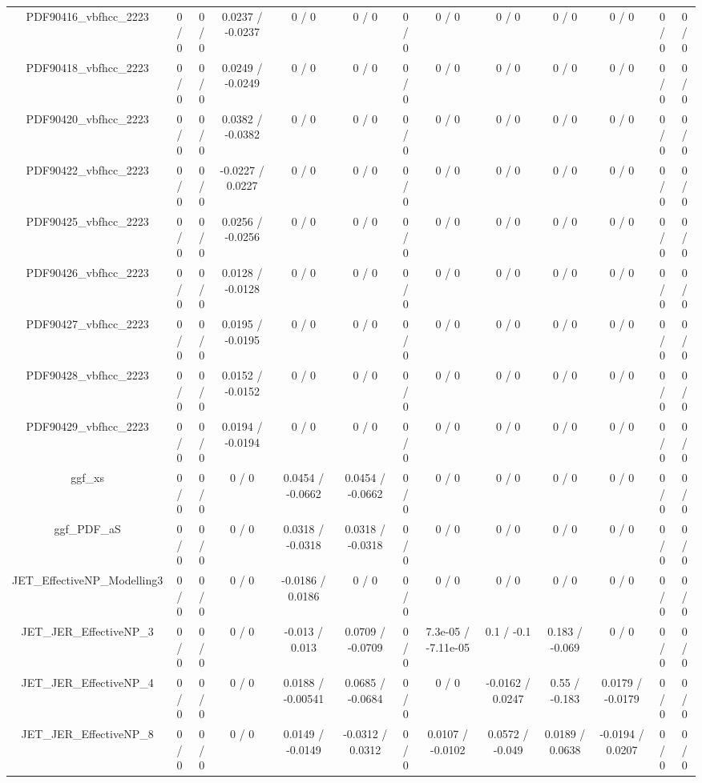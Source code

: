 \documentclass[10pt]{article}
\begin{document}
\begin{table}[htbp]
\begin{center}
\begin{tabular}{|c|c|c|c|c|c|c|c|c|c|c|c|c|}
  PDF90416_vbfhcc_2223 & 0 / 0 & 0 / 0 & 0.0237 / -0.0237 & 0 / 0 & 0 / 0 & 0 / 0 & 0 / 0 & 0 / 0 & 0 / 0 & 0 / 0 & 0 / 0 & 0 / 0 \\ 
  PDF90418_vbfhcc_2223 & 0 / 0 & 0 / 0 & 0.0249 / -0.0249 & 0 / 0 & 0 / 0 & 0 / 0 & 0 / 0 & 0 / 0 & 0 / 0 & 0 / 0 & 0 / 0 & 0 / 0 \\ 
  PDF90420_vbfhcc_2223 & 0 / 0 & 0 / 0 & 0.0382 / -0.0382 & 0 / 0 & 0 / 0 & 0 / 0 & 0 / 0 & 0 / 0 & 0 / 0 & 0 / 0 & 0 / 0 & 0 / 0 \\ 
  PDF90422_vbfhcc_2223 & 0 / 0 & 0 / 0 & -0.0227 / 0.0227 & 0 / 0 & 0 / 0 & 0 / 0 & 0 / 0 & 0 / 0 & 0 / 0 & 0 / 0 & 0 / 0 & 0 / 0 \\ 
  PDF90425_vbfhcc_2223 & 0 / 0 & 0 / 0 & 0.0256 / -0.0256 & 0 / 0 & 0 / 0 & 0 / 0 & 0 / 0 & 0 / 0 & 0 / 0 & 0 / 0 & 0 / 0 & 0 / 0 \\ 
  PDF90426_vbfhcc_2223 & 0 / 0 & 0 / 0 & 0.0128 / -0.0128 & 0 / 0 & 0 / 0 & 0 / 0 & 0 / 0 & 0 / 0 & 0 / 0 & 0 / 0 & 0 / 0 & 0 / 0 \\ 
  PDF90427_vbfhcc_2223 & 0 / 0 & 0 / 0 & 0.0195 / -0.0195 & 0 / 0 & 0 / 0 & 0 / 0 & 0 / 0 & 0 / 0 & 0 / 0 & 0 / 0 & 0 / 0 & 0 / 0 \\ 
  PDF90428_vbfhcc_2223 & 0 / 0 & 0 / 0 & 0.0152 / -0.0152 & 0 / 0 & 0 / 0 & 0 / 0 & 0 / 0 & 0 / 0 & 0 / 0 & 0 / 0 & 0 / 0 & 0 / 0 \\ 
  PDF90429_vbfhcc_2223 & 0 / 0 & 0 / 0 & 0.0194 / -0.0194 & 0 / 0 & 0 / 0 & 0 / 0 & 0 / 0 & 0 / 0 & 0 / 0 & 0 / 0 & 0 / 0 & 0 / 0 \\ 
  ggf_xs & 0 / 0 & 0 / 0 & 0 / 0 & 0.0454 / -0.0662 & 0.0454 / -0.0662 & 0 / 0 & 0 / 0 & 0 / 0 & 0 / 0 & 0 / 0 & 0 / 0 & 0 / 0 \\ 
  ggf_PDF_aS & 0 / 0 & 0 / 0 & 0 / 0 & 0.0318 / -0.0318 & 0.0318 / -0.0318 & 0 / 0 & 0 / 0 & 0 / 0 & 0 / 0 & 0 / 0 & 0 / 0 & 0 / 0 \\ 
  JET_EffectiveNP_Modelling3 & 0 / 0 & 0 / 0 & 0 / 0 & -0.0186 / 0.0186 & 0 / 0 & 0 / 0 & 0 / 0 & 0 / 0 & 0 / 0 & 0 / 0 & 0 / 0 & 0 / 0 \\ 
  JET_JER_EffectiveNP_3 & 0 / 0 & 0 / 0 & 0 / 0 & -0.013 / 0.013 & 0.0709 / -0.0709 & 0 / 0 & 7.3e-05 / -7.11e-05 & 0.1 / -0.1 & 0.183 / -0.069 & 0 / 0 & 0 / 0 & 0 / 0 \\ 
  JET_JER_EffectiveNP_4 & 0 / 0 & 0 / 0 & 0 / 0 & 0.0188 / -0.00541 & 0.0685 / -0.0684 & 0 / 0 & 0 / 0 & -0.0162 / 0.0247 & 0.55 / -0.183 & 0.0179 / -0.0179 & 0 / 0 & 0 / 0 \\ 
  JET_JER_EffectiveNP_8 & 0 / 0 & 0 / 0 & 0 / 0 & 0.0149 / -0.0149 & -0.0312 / 0.0312 & 0 / 0 & 0.0107 / -0.0102 & 0.0572 / -0.049 & 0.0189 / 0.0638 & -0.0194 / 0.0207 & 0 / 0 & 0 / 0 \\ 

\end{tabular}
\end{center}
\end{table}
\end{document}
